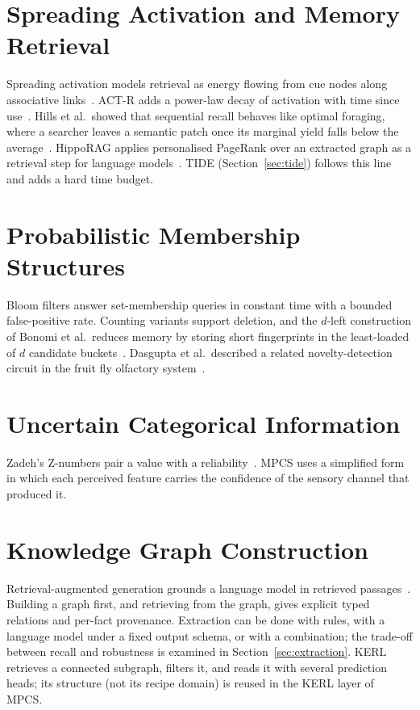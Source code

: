 \documentclass[12pt,a4paper,oneside]{report}
\begin{document}
\section{Spreading Activation and Memory Retrieval}
Spreading activation models retrieval as energy flowing from cue nodes along associative links~\cite{collins1975}. ACT-R adds a power-law decay of activation with time since use~\cite{anderson2004}. Hills et al.\ showed that sequential recall behaves like optimal foraging, where a searcher leaves a semantic patch once its marginal yield falls below the average~\cite{hills2012,charnov1976}. HippoRAG applies personalised PageRank over an extracted graph as a retrieval step for language models~\cite{gutierrez2024}. TIDE (Section~\ref{sec:tide}) follows this line and adds a hard time budget.

\section{Probabilistic Membership Structures}
Bloom filters answer set-membership queries in constant time with a bounded false-positive rate. Counting variants support deletion, and the $d$-left construction of Bonomi et al.\ reduces memory by storing short fingerprints in the least-loaded of $d$ candidate buckets~\cite{bonomi2006}. Dasgupta et al.\ described a related novelty-detection circuit in the fruit fly olfactory system~\cite{dasgupta2018}.

\section{Uncertain Categorical Information}
Zadeh's Z-numbers pair a value with a reliability~\cite{zadeh2011}. MPCS uses a simplified form in which each perceived feature carries the confidence of the sensory channel that produced it.

\section{Knowledge Graph Construction}
Retrieval-augmented generation grounds a language model in retrieved passages~\cite{lewis2020}. Building a graph first, and retrieving from the graph, gives explicit typed relations and per-fact provenance. Extraction can be done with rules, with a language model under a fixed output schema, or with a combination; the trade-off between recall and robustness is examined in Section~\ref{sec:extraction}. KERL~\cite{mohbat2025} retrieves a connected subgraph, filters it, and reads it with several prediction heads; its structure (not its recipe domain) is reused in the KERL layer of MPCS.
\end{document}
